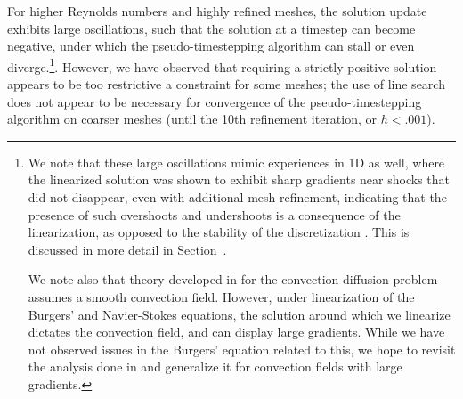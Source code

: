 For higher Reynolds numbers and highly refined meshes, the solution update exhibits large oscillations, such that the solution at a timestep can become negative, under which the pseudo-timestepping algorithm can stall or even diverge.\footnote{We note that these large oscillations mimic experiences in 1D as well, where the linearized solution was shown to exhibit sharp gradients near shocks that did not disappear, even with additional mesh refinement, indicating that the presence of such overshoots and undershoots is a consequence of the linearization, as opposed to the stability of the discretization \cite{NS_DPG1D}. This is discussed in more detail in Section~.  

We note also that theory developed in \cite{DPGrobustness2} for the convection-diffusion problem assumes a smooth convection field.  However, under linearization of the Burgers' and Navier-Stokes equations, the solution around which we linearize dictates the convection field, and can display large gradients.  While we have not observed issues in the Burgers' equation related to this, we hope to revisit the analysis done in \cite{DPGrobustness2} and generalize it for convection fields with large gradients.}.  However, we have observed that requiring a strictly positive solution appears to be too restrictive a constraint for some meshes; the use of line search does not appear to be necessary for convergence of the pseudo-timestepping algorithm on coarser meshes (until the 10th refinement iteration, or $h< .001$).  

